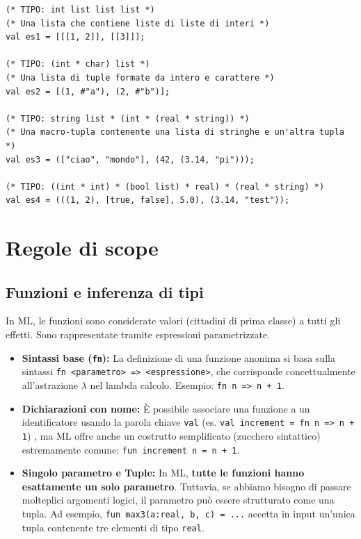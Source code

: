 \documentclass[12pt, a4paper]{article}
\begin{document}
\begin{verbatim}
(* TIPO: int list list list *)
(* Una lista che contiene liste di liste di interi *)
val es1 = [[[1, 2]], [[3]]];

(* TIPO: (int * char) list *)
(* Una lista di tuple formate da intero e carattere *)
val es2 = [(1, #"a"), (2, #"b")];

(* TIPO: string list * (int * (real * string)) *)
(* Una macro-tupla contenente una lista di stringhe e un'altra tupla *)
val es3 = (["ciao", "mondo"], (42, (3.14, "pi")));

(* TIPO: ((int * int) * (bool list) * real) * (real * string) *)
val es4 = (((1, 2), [true, false], 5.0), (3.14, "test"));
\end{verbatim}

\section{Regole di scope}

\subsection{Funzioni e inferenza di tipi}
In ML, le funzioni sono considerate valori (cittadini di prima classe) a tutti gli effetti. Sono rappresentate tramite espressioni parametrizzate.
\begin{itemize}
    \item \textbf{Sintassi base (\texttt{fn}):} La definizione di una funzione anonima si basa sulla sintassi \texttt{fn <parametro> => <espressione>}, che corrisponde concettualmente all'astrazione $\lambda$ nel lambda calcolo. Esempio: \texttt{fn n => n + 1}.
    \item \textbf{Dichiarazioni con nome:} È possibile associare una funzione a un identificatore usando la parola chiave \texttt{val} (es. \texttt{val increment = fn n => n + 1}) , ma ML offre anche un costrutto semplificato (zucchero sintattico) estremamente comune: \texttt{fun increment n = n + 1}.
    \item \textbf{Singolo parametro e Tuple:} In ML, \textbf{tutte le funzioni hanno esattamente un solo parametro}. Tuttavia, se abbiamo bisogno di passare molteplici argomenti logici, il parametro può essere strutturato come una tupla. Ad esempio, \texttt{fun max3(a:real, b, c) = ...} accetta in input un'unica tupla contenente tre elementi di tipo \texttt{real}.
\end{itemize}

\newpage
\end{document}
